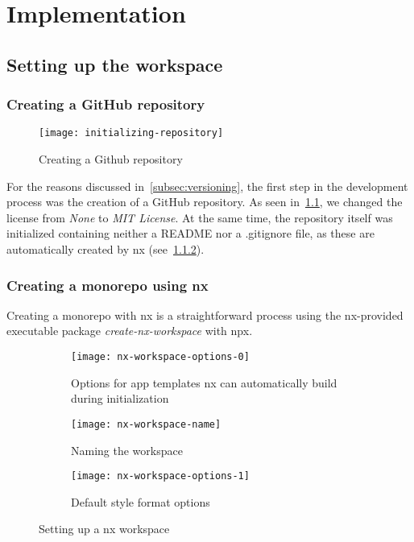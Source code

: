 \chapter{Implementation}\label{ch:implementation}

\section{Setting up the workspace}\label{sec:setting-up-the-workspace}

\subsection{Creating a GitHub repository}\label{subsec:creating-a-git-repository}

\begin{figure}[H]
    \centering
    \texttt{[image: initializing-repository]}
    \caption{Creating a Github repository}
    \label{fig:initializing-repository}
\end{figure}

For the reasons discussed in~\cref{subsec:versioning}, the first step in the development process was the creation of a GitHub repository.
As seen in~\cref{fig:initializing-repository}, we changed the license from \emph{None} to \emph{MIT License}.
At the same time, the repository itself was initialized containing neither a README nor a .gitignore file, as these are automatically created by nx (see~\cref{subsec:creating-a-monorepo-using-nx}).

\subsection{Creating a monorepo using nx}\label{subsec:creating-a-monorepo-using-nx}

Creating a monorepo with nx is a straightforward process using the nx-provided executable package \emph{create-nx-workspace} with \gls{npx}.

\begin{figure}
    \begin{subfigure}[b]{\textwidth}
        \centering
        \texttt{[image: nx-workspace-options-0]}
        \caption{Options for app templates nx can automatically build during initialization}
        \label{fig:nx-workspace-options-0}
    \end{subfigure}
    \begin{subfigure}[b]{0.5\textwidth}
        \centering
        \texttt{[image: nx-workspace-name]}
        \caption{Naming the workspace}
        \label{fig:nx-workspace-name}
    \end{subfigure}
    \begin{subfigure}[b]{0.5\textwidth}
        \centering
        \texttt{[image: nx-workspace-options-1]}
        \caption{Default style format options}
        \label{fig:nx-workspace-options-1}
    \end{subfigure}
    \caption{Setting up a nx workspace}
    \label{fig:setting-up-nx-workspace}
\end{figure}

